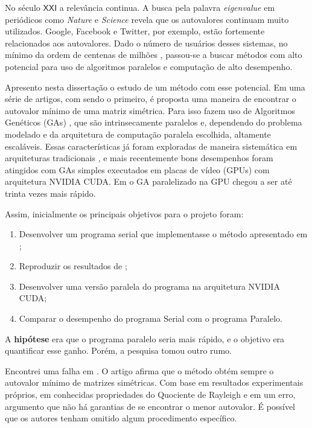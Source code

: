 	No século $\mathsf{XXI}$ a relevância continua. A busca pela palavra \emph{eigenvalue} em periódicos como \emph{Nature} e \emph{Science} revela que os autovalores continuam muito utilizados. Google, Facebook e Twitter, por exemplo, estão fortemente relacionados aos autovalores. Dado o número de usuários desses sistemas, no mínimo da ordem de centenas de milhões \cite{twitter2010}, passou-se a buscar métodos com alto potencial para uso de algoritmos paralelos e computação de alto desempenho.
	
	Apresento nesta dissertação o estudo de um método com esse potencial. Em uma série de artigos, com \cite{metodo2004} sendo o primeiro, é proposta uma maneira de encontrar o autovalor mínimo de uma matriz simétrica. Para isso fazem uso de Algoritmos Genéticos (GAs) \cite{Mitchell98}, que são intrinsecamente paralelos \cite{Linden2008} e, dependendo do problema modelado e da arquitetura de computação paralela escolhida, altamente escaláveis. Essas características já foram exploradas de maneira sistemática em arquiteturas tradicionais \cite{Cantu-Paz2000}, e mais recentemente bons desempenhos foram atingidos com GAs simples executados em placas de vídeo (GPUs) com arquitetura NVIDIA CUDA. Em \cite{onemaxNaGPU} o GA paralelizado na GPU chegou a ser até trinta vezes mais rápido.

	Assim, inicialmente os principais objetivos para o projeto foram:
	
	\begin{enumerate}
		\item Desenvolver um programa serial que implementasse o método apresentado em \cite{metodo2004};
		
		\item Reproduzir os resultados de \cite{metodo2004};
		
		\item Desenvolver uma versão paralela do programa na arquitetura NVIDIA CUDA;
		
		\item Comparar o desempenho do programa Serial com o programa Paralelo.
	\end{enumerate}
	
	A \textbf{hipótese} era que o programa paralelo seria mais rápido, e o objetivo era quantificar esse ganho. Porém, a pesquisa tomou outro rumo.
	
	Encontrei uma falha em \cite{metodo2004}. O artigo afirma que o método obtém sempre o autovalor mínimo de matrizes simétricas. Com base em resultados experimentais próprios, em conhecidas propriedades do Quociente de Rayleigh e em um erro, argumento que não há garantias de se encontrar o menor autovalor. É possível que os autores tenham omitido algum procedimento específico.
	
